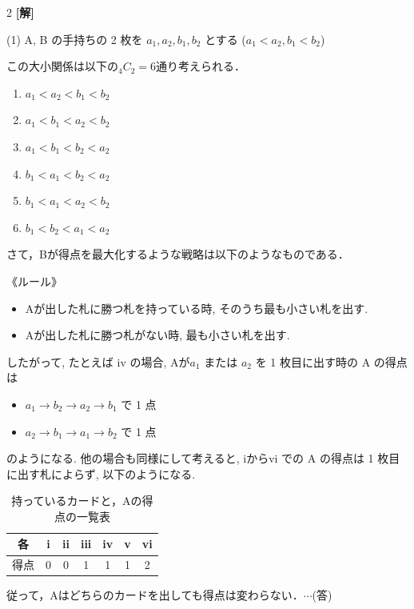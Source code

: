 \documentclass[../../../../main.tex]{subfiles}
\begin{document}
\setcounter{equation}{0}
\begin{oframed}
  
\end{oframed}
\setlength{\columnseprule}{0.4pt}
\begin{multicols}{2}
  {\bf[解]}

  (1)
  A, B の手持ちの 2 枚を $a_1, a_2, b_1, b_2$ とする ($a_1 < a_2, b_1 < b_2$)

  この大小関係は以下の${}_4C_2=6$通り考えられる．
  \begin{enumerate}[i]
    \item  $a_1 < a_2 < b_1 < b_2$
    \item  $a_1 < b_1 < a_2 < b_2$
    \item  $a_1 < b_1 < b_2 < a_2$
    \item  $b_1 < a_1 < b_2 < a_2$
    \item  $b_1 < a_1 < a_2 < b_2$
    \item  $b_1 < b_2 < a_1 < a_2$
  \end{enumerate}

  さて，Bが得点を最大化するような戦略は以下のようなものである．

  《ルール》
  \begin{itemize}
    \item Aが出した札に勝つ札を持っている時, そのうち最も小さい札を出す.
    \item Aが出した札に勝つ札がない時, 最も小さい札を出す.
  \end{itemize}

  したがって, たとえば iv の場合, Aが$a_1$ または $a_2$ を 1 枚目に出す時の A の得点は
  \begin{itemize}
    \item $a_1 \to b_2 \to a_2 \to b_1$ で 1 点
    \item $a_2 \to b_1 \to a_1 \to b_2$ で 1 点
  \end{itemize}
  のようになる.
  他の場合も同様にして考えると, iからvi での A の得点は 1 枚目に出す札によらず, 以下のようになる.
  \begin{table}[H]
    \centering
    \caption{持っているカードと，Aの得点の一覧表}
    \label{1995-3:table:1}
    \begin{tabular}{|c|c|c|c|c|c|c|}
      \hline
      各  & i & ii & iii & iv & v & vi \\
      \hline
      得点 & 0 & 0  & 1   & 1  & 1 & 2  \\
      \hline
    \end{tabular}
  \end{table}
  従って，Aはどちらのカードを出しても得点は変わらない．$\cdots$(答)


\end{multicols}
\end{document}
